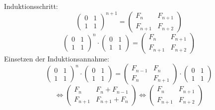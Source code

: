 \documentclass{article}
\begin{document}
\begin{enumerate}
\begin{enumerate}
                Induktionsschritt:
                    \[\begin{pmatrix} 0&1 \\ 1&1 \end{pmatrix}^{n+1}
                    = \begin{pmatrix} F_{n} & F_{n+1} \\ F_{n+1} & F_{n+2} \end{pmatrix} \]
                    \[ \begin{pmatrix} 0&1 \\ 1&1 \end{pmatrix}^{n} \cdot \begin{pmatrix} 0&1 \\ 1&1 \end{pmatrix} 
                    = \begin{pmatrix} F_{n} & F_{n+1} \\ F_{n+1} & F_{n+2} \end{pmatrix} \]
                Einsetzen der Induktionsannahme:
                    \[ \begin{pmatrix} 0&1 \\ 1&1 \end{pmatrix}^{n} \cdot \begin{pmatrix} 0&1 \\ 1&1 \end{pmatrix} 
                    = \begin{pmatrix} F_{n-1} & F_n \\ F_n & F_{n+1} \end{pmatrix} \cdot \begin{pmatrix} 0&1 \\ 1&1 \end{pmatrix} \]
                    \[ \Leftrightarrow \begin{pmatrix} F_n & F_n + F_{n-1} \\ F_{n+1} & F_{n+1} + F_n \end{pmatrix} 
                    \Leftrightarrow \begin{pmatrix} F_{n} & F_{n+1} \\ F_{n+1} & F_{n+2} \end{pmatrix} \]


\end{enumerate}
\end{enumerate}
\end{document}
